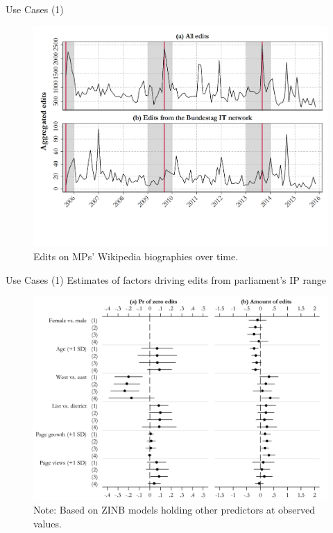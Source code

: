 \begin{frame}{Use Cases (1)}
\begin{figure}[t]
\begin{center}
\vspace{-.1cm}
	\includegraphics[scale=.36]{figure3.pdf}
	\vspace{-1.4cm}
	\caption{Edits on MPs' Wikipedia biographies over time.}
\end{center}
\end{figure}
\end{frame}

\begin{frame}{Use Cases (1)}
\vspace{0cm}
Estimates of factors driving edits from parliament's IP range
\vspace{-0.1cm}
\begin{figure}[t]
\begin{center}
	\includegraphics[scale=.75]{figure6.jpg}
		\vspace{-0.3cm}
	\caption{\tiny{Note: Based on ZINB models holding other predictors at observed values.}}
\end{center}
\end{figure}
\end{frame}

